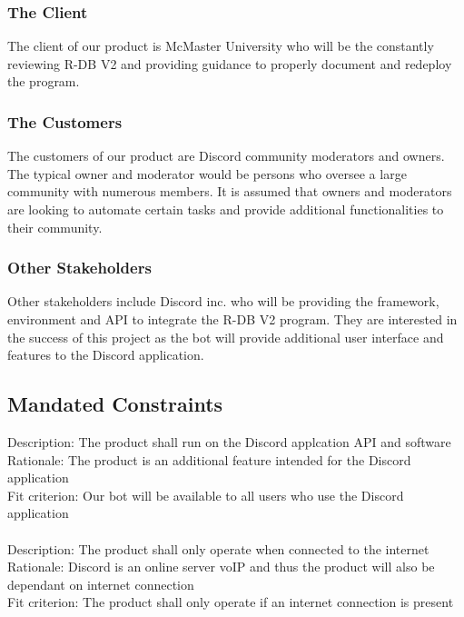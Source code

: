 \documentclass[12pt, titlepage]{article}
\begin{document}
\subsubsection{The Client}
	The client of our product is McMaster University who will be the constantly reviewing R-DB V2 and providing guidance to properly document and redeploy the program.

\subsubsection{The Customers}
	The customers of our product are Discord community moderators and owners. The typical owner and moderator would be persons who oversee a large community with numerous members. It is assumed that owners and moderators are looking to automate certain tasks and provide additional functionalities to their community. 


\subsubsection{Other Stakeholders}
Other stakeholders include Discord inc. who will be providing the framework, environment and API to integrate the R-DB V2 program. They are interested in the success of this project as the bot will provide additional user interface and features to the Discord application.

\subsection{Mandated Constraints}
Description: The product shall run on the Discord applcation API and software\\
Rationale: The product is an additional feature intended for the Discord application\\
Fit criterion: Our bot will be available to all users who use the Discord application\\\\

\noindent
Description: The product shall only operate when connected to the internet\\
Rationale: Discord is an online server voIP and thus the product will also be dependant on internet connection\\
Fit criterion: The product shall only operate if an internet connection is present\\
\end{document}
